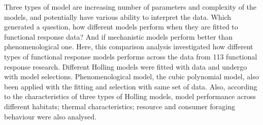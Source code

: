 \documentclass[11pt, a4paper]{article}
\begin{document}
Three types of model are increasing number of parameters and complexity of the models, and potentially have various ability to interpret the data. Which generated a question, how different models perform when they are fitted to functional response data? And if mechanistic models perform better than phenomenological one. Here, this comparison analysis investigated how different types of functional response models performs across the data from 113 functional response research. Different Holling models were fitted with data and undergo with model selections. Phenomenological model, the cubic polynomial model, also been applied with the fitting and selection with same set of data. Also, according to the characteristics of three types of Holling models, model performance across different habitats; thermal characteristics; resource and consumer foraging behaviour were also analysed.
\end{document}
